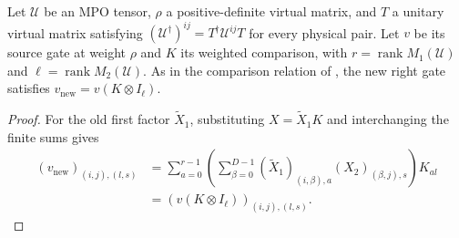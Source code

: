 \begin{lemma}
    \label{thm:mpug_inverse_new_v_transport}
    \leanok
    Let $\mathcal U$ be an MPO tensor, $\rho$ a positive-definite virtual
    matrix, and $T$ a unitary virtual matrix satisfying
    $(\mathcal U^\dagger)^{ij}=T^\dagger\mathcal U^{ij}T$ for every
    physical pair. Let $v$ be its source gate at weight $\rho$ and $K$
    its weighted comparison, with $r=\operatorname{rank}M_1(\mathcal U)$
    and $\ell=\operatorname{rank}M_2(\mathcal U)$. As in the comparison
    relation of \cite[lines~5432--5443 and 5486--5487]{FrancoRubio2025MPUGauging},
    the new right gate satisfies
    $v_{\mathrm{new}}=v(K\otimes I_\ell)$.
\end{lemma}
\begin{proof}\leanok
    For the old first factor $\widetilde X_1$, substituting
    $X=\widetilde X_1K$ and interchanging the finite sums gives
    \begin{align}
        (v_{\mathrm{new}})_{(i,j),(l,s)}
         & =\sum_{a=0}^{r-1}\left(\sum_{\beta=0}^{D-1}
        (\widetilde X_1)_{(i,\beta),a}(X_2)_{(\beta,j),s}\right)K_{al} \\
         & =(v(K\otimes I_\ell))_{(i,j),(l,s)}.
    \end{align}
\end{proof}

